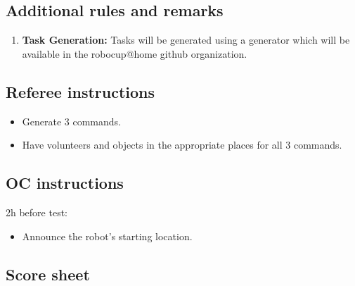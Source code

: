 \subsection{Additional rules and remarks}
\begin{enumerate}
	\item \textbf{Task Generation:}  Tasks will be generated using a generator which will be available in the robocup@home github organization.
\end{enumerate}

\subsection{Referee instructions}
\begin{itemize}
	\item Generate 3 commands.
	\item Have volunteers and objects in the appropriate places for all 3 commands.
\end{itemize}

\subsection{OC instructions}

2h before test:
\begin{itemize}
	\item Announce the robot's starting location.
\end{itemize}


\newpage
\subsection{Score sheet}


